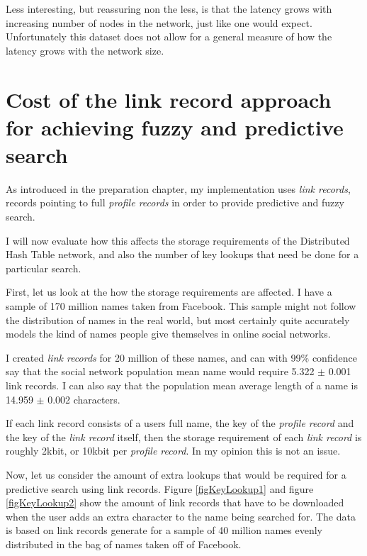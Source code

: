 Less interesting, but reassuring non the less, is that the latency grows with increasing number of nodes in the network, just like one would expect. Unfortunately this dataset does not allow for a general measure of how the latency grows with the network size.

\section{Cost of the link record approach for achieving fuzzy and predictive search}
As introduced in the preparation chapter, my implementation uses \emph{link records}, records pointing to full \emph{profile records} in order to provide predictive and fuzzy search.

I will now evaluate how this affects the storage requirements of the Distributed Hash Table network, and also the number of key lookups that need be done for a particular search.

First, let us look at the how the storage requirements are affected.
I have a sample of 170 million names taken from Facebook. This sample might not follow the distribution of names in the real world, but most certainly quite accurately models the kind of names people give themselves in online social networks.

I created \emph{link records} for 20 million of these names, and can with 99\% confidence say that the social network population mean name would require 5.322 $\pm$ 0.001 link records. I can also say that the population mean average length of a name is 14.959 $\pm$ 0.002 characters.

If each link record consists of a users full name, the key of the \emph{profile record} and the key of the \emph{link record} itself, then the storage requirement of each \emph{link record} is roughly 2kbit, or 10kbit per \emph{profile record}.
In my opinion this is not an issue.

Now, let us consider the amount of extra lookups that would be required for a predictive search using link records. Figure \ref{figKeyLookup1} and figure \ref{figKeyLookup2} show the amount of link records that have to be downloaded when the user adds an extra character to the name being searched for. The data is based on link records generate for a sample of 40 million names evenly distributed in the bag of names taken off of Facebook.

